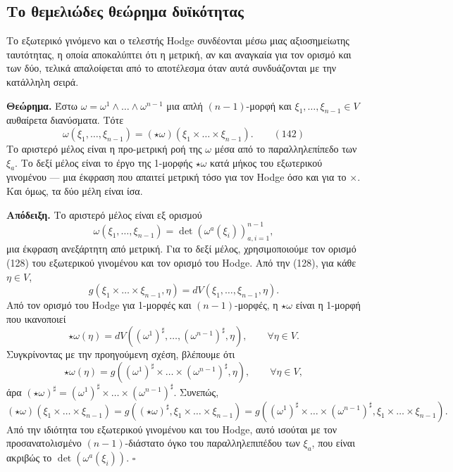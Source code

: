 \documentclass[12pt]{article}
\begin{document}
\subsection{Το θεμελιώδες θεώρημα δυϊκότητας}

Το εξωτερικό γινόμενο και ο τελεστής Hodge συνδέονται μέσω μιας αξιοσημείωτης ταυτότητας, η οποία αποκαλύπτει ότι η μετρική, αν και αναγκαία για τον ορισμό και των δύο, τελικά απαλοίφεται από το αποτέλεσμα όταν αυτά συνδυάζονται με την κατάλληλη σειρά.

\textbf{Θεώρημα.} Έστω $\omega = \omega^1 \wedge \dots \wedge \omega^{n-1}$ μια απλή $(n-1)$-μορφή και $\xi_1, \dots, \xi_{n-1} \in V$ αυθαίρετα διανύσματα. Τότε
\begin{equation}
\omega(\xi_1, \dots, \xi_{n-1}) = (\star \omega)(\xi_1 \times \dots \times \xi_{n-1}). \qquad (142)
\end{equation}
Το αριστερό μέλος είναι η προ-μετρική ροή της $\omega$ μέσα από το παραλληλεπίπεδο των $\xi_a$. Το δεξί μέλος είναι το έργο της 1-μορφής $\star \omega$ κατά μήκος του εξωτερικού γινομένου — μια έκφραση που απαιτεί μετρική τόσο για τον Hodge όσο και για το $\times$. Και όμως, τα δύο μέλη είναι ίσα.

\textbf{Απόδειξη.} Το αριστερό μέλος είναι εξ ορισμού
\[
\omega(\xi_1, \dots, \xi_{n-1}) = \det \left( \omega^a(\xi_i) \right)_{a,i=1}^{n-1},
\]
μια έκφραση ανεξάρτητη από μετρική. Για το δεξί μέλος, χρησιμοποιούμε τον ορισμό (128) του εξωτερικού γινομένου και τον ορισμό του Hodge. Από την (128), για κάθε $\eta \in V$,
\[
g(\xi_1 \times \dots \times \xi_{n-1}, \eta) = dV(\xi_1, \dots, \xi_{n-1}, \eta).
\]
Από τον ορισμό του Hodge για 1-μορφές και $(n-1)$-μορφές, η $\star \omega$ είναι η 1-μορφή που ικανοποιεί
\[
\star \omega(\eta) = dV((\omega^1)^\sharp, \dots, (\omega^{n-1})^\sharp, \eta), \qquad \forall \eta \in V.
\]
Συγκρίνοντας με την προηγούμενη σχέση, βλέπουμε ότι
\[
\star \omega(\eta) = g((\omega^1)^\sharp \times \dots \times (\omega^{n-1})^\sharp, \eta), \qquad \forall \eta \in V,
\]
άρα $(\star \omega)^\sharp = (\omega^1)^\sharp \times \dots \times (\omega^{n-1})^\sharp$. Συνεπώς,
\[
(\star \omega)(\xi_1 \times \dots \times \xi_{n-1}) = g((\star \omega)^\sharp, \xi_1 \times \dots \times \xi_{n-1}) = g((\omega^1)^\sharp \times \dots \times (\omega^{n-1})^\sharp, \xi_1 \times \dots \times \xi_{n-1}).
\]
Από την ιδιότητα του εξωτερικού γινομένου και του Hodge, αυτό ισούται με τον προσανατολισμένο $(n-1)$-διάστατο όγκο του παραλληλεπιπέδου των $\xi_a$, που είναι ακριβώς το $\det(\omega^a(\xi_i))$. $\square$
\end{document}
